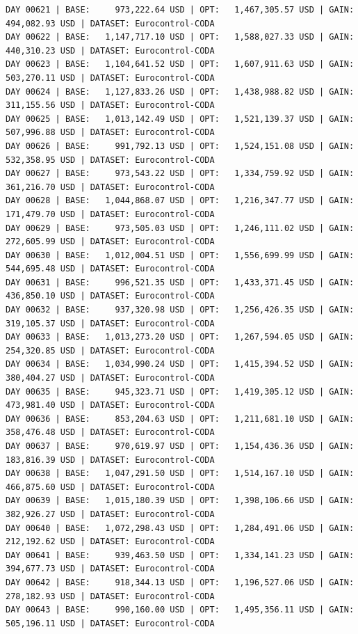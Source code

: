 \documentclass[11pt,a4paper]{article}
\begin{document}
\begin{verbatim}
DAY 00621 | BASE:     973,222.64 USD | OPT:   1,467,305.57 USD | GAIN: 494,082.93 USD | DATASET: Eurocontrol-CODA
DAY 00622 | BASE:   1,147,717.10 USD | OPT:   1,588,027.33 USD | GAIN: 440,310.23 USD | DATASET: Eurocontrol-CODA
DAY 00623 | BASE:   1,104,641.52 USD | OPT:   1,607,911.63 USD | GAIN: 503,270.11 USD | DATASET: Eurocontrol-CODA
DAY 00624 | BASE:   1,127,833.26 USD | OPT:   1,438,988.82 USD | GAIN: 311,155.56 USD | DATASET: Eurocontrol-CODA
DAY 00625 | BASE:   1,013,142.49 USD | OPT:   1,521,139.37 USD | GAIN: 507,996.88 USD | DATASET: Eurocontrol-CODA
DAY 00626 | BASE:     991,792.13 USD | OPT:   1,524,151.08 USD | GAIN: 532,358.95 USD | DATASET: Eurocontrol-CODA
DAY 00627 | BASE:     973,543.22 USD | OPT:   1,334,759.92 USD | GAIN: 361,216.70 USD | DATASET: Eurocontrol-CODA
DAY 00628 | BASE:   1,044,868.07 USD | OPT:   1,216,347.77 USD | GAIN: 171,479.70 USD | DATASET: Eurocontrol-CODA
DAY 00629 | BASE:     973,505.03 USD | OPT:   1,246,111.02 USD | GAIN: 272,605.99 USD | DATASET: Eurocontrol-CODA
DAY 00630 | BASE:   1,012,004.51 USD | OPT:   1,556,699.99 USD | GAIN: 544,695.48 USD | DATASET: Eurocontrol-CODA
DAY 00631 | BASE:     996,521.35 USD | OPT:   1,433,371.45 USD | GAIN: 436,850.10 USD | DATASET: Eurocontrol-CODA
DAY 00632 | BASE:     937,320.98 USD | OPT:   1,256,426.35 USD | GAIN: 319,105.37 USD | DATASET: Eurocontrol-CODA
DAY 00633 | BASE:   1,013,273.20 USD | OPT:   1,267,594.05 USD | GAIN: 254,320.85 USD | DATASET: Eurocontrol-CODA
DAY 00634 | BASE:   1,034,990.24 USD | OPT:   1,415,394.52 USD | GAIN: 380,404.27 USD | DATASET: Eurocontrol-CODA
DAY 00635 | BASE:     945,323.71 USD | OPT:   1,419,305.12 USD | GAIN: 473,981.40 USD | DATASET: Eurocontrol-CODA
DAY 00636 | BASE:     853,204.63 USD | OPT:   1,211,681.10 USD | GAIN: 358,476.48 USD | DATASET: Eurocontrol-CODA
DAY 00637 | BASE:     970,619.97 USD | OPT:   1,154,436.36 USD | GAIN: 183,816.39 USD | DATASET: Eurocontrol-CODA
DAY 00638 | BASE:   1,047,291.50 USD | OPT:   1,514,167.10 USD | GAIN: 466,875.60 USD | DATASET: Eurocontrol-CODA
DAY 00639 | BASE:   1,015,180.39 USD | OPT:   1,398,106.66 USD | GAIN: 382,926.27 USD | DATASET: Eurocontrol-CODA
DAY 00640 | BASE:   1,072,298.43 USD | OPT:   1,284,491.06 USD | GAIN: 212,192.62 USD | DATASET: Eurocontrol-CODA
DAY 00641 | BASE:     939,463.50 USD | OPT:   1,334,141.23 USD | GAIN: 394,677.73 USD | DATASET: Eurocontrol-CODA
DAY 00642 | BASE:     918,344.13 USD | OPT:   1,196,527.06 USD | GAIN: 278,182.93 USD | DATASET: Eurocontrol-CODA
DAY 00643 | BASE:     990,160.00 USD | OPT:   1,495,356.11 USD | GAIN: 505,196.11 USD | DATASET: Eurocontrol-CODA

\end{verbatim}
\end{document}

